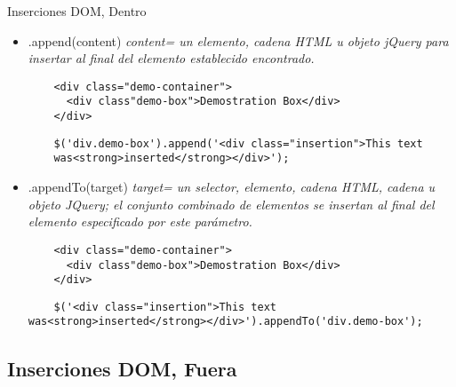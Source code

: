 \begin{frame}[fragile]{Inserciones DOM, Dentro} %
\begin{itemize}
    \item .append(content) \textit{ content= un elemento, cadena HTML u objeto
    jQuery para insertar al final del elemento establecido encontrado.} 
    \begin{lstlisting}
    <div class="demo-container">
      <div class"demo-box">Demostration Box</div>
    </div>
    \end{lstlisting}
    \begin{lstlisting}
    $('div.demo-box').append('<div class="insertion">This text
    was<strong>inserted</strong></div>');
    \end{lstlisting}
    \item .appendTo(target) \textit{ target= un selector, elemento, cadena
    HTML, cadena u objeto JQuery; el conjunto combinado de elementos se
    insertan al final del elemento especificado por este parámetro.} 
    \begin{lstlisting}
    <div class="demo-container">
      <div class"demo-box">Demostration Box</div>
    </div>
    \end{lstlisting}
    \begin{lstlisting}
    $('<div class="insertion">This text was<strong>inserted</strong></div>').appendTo('div.demo-box');
    \end{lstlisting}
\end{itemize}
\end{frame}

\subsection{Inserciones DOM, Fuera} %

